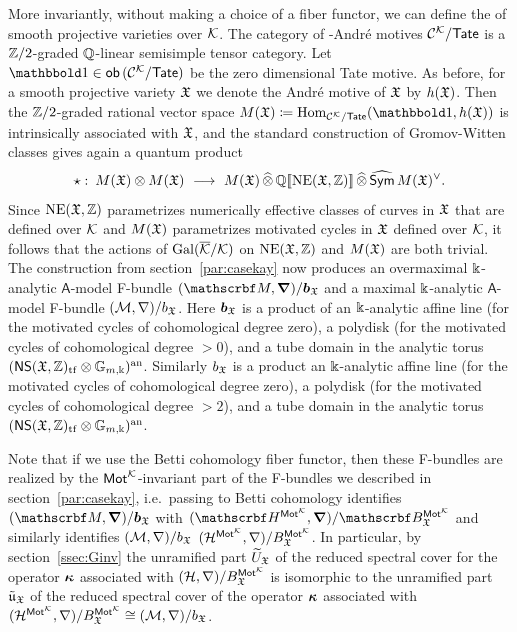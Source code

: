 \documentclass[twoside,leqno]{article}
\numberwithin{equation}{section}
\theoremstyle{plain}
\theoremstyle{definition}
\begin{document}
More invariantly, without making a choice of a fiber functor, we can define the  of smooth projective varieties over $\mathcal K$. The category of \nc-Andr\'e motives $\mathcal{C}^{\mathcal K}/\mathsf{Tate}$ is a $\mathbb Z/2$-graded $\mathbb Q$-linear semisimple tensor category. Let $\triv \in \mathsf{ob} \, (\CA{\kay}/\mathsf{Tate})$
be the zero dimensional Tate motive. As before, for a smooth projective variety $\mathfrak X$ we denote the Andr\'{e} motive of $\mathfrak X$ by $h(\mathfrak X)$. Then the $\mathbb Z/2$-graded rational vector space $M(\fX) \coloneqq \op{Hom}_{\CA{\kay}/\mathsf{Tate}}(\triv,h(\fX))$ is intrinsically associated with $\mathfrak X$, and the standard construction of Gromov-Witten classes gives again a quantum product 
\[
\star \, \colon \, M(\mathfrak X)\otimes M(\mathfrak X) \ \longrightarrow \ M(\mathfrak X)\, \widehat{\otimes} \, \mathbb Q[\![\operatorname{NE}(\mathfrak X,\mathbb Z)]\!] \, \widehat{\otimes}\, \widehat{\mathsf{Sym}}\, M(\mathfrak X)^{\vee}. 
\]
Since $\operatorname{NE}(\mathfrak X,\mathbb Z)$ parametrizes numerically effective classes of curves in $\mathfrak X$ that are defined over $\mathcal K$ and $M(\mathfrak X)$ parametrizes motivated cycles in $\mathfrak X$ defined over $\mathcal K$, it follows that the actions of $\operatorname{Gal}(\overline{\mathcal K}/\mathcal K)$ on $\operatorname{NE}(\mathfrak X,\mathbb Z)$ and $M(\mathfrak X)$ are both trivial. The construction from section~\ref{par:casekay} now produces an overmaximal $\Bbbk$-analytic $\mathsf{A}$-model F-bundle  
$(\mycalb{M},\bnabla)/\boldsymbol{b}_{\fX}$ and a maximal $\Bbbk$-analytic $\mathsf{A}$-model F-bundle  
$(\mathcal{M},\nabla)/b_{\mathfrak X}$. Here $\boldsymbol{b}_{\mathfrak X}$ is a product of an $\Bbbk$-analytic affine line (for the motivated cycles of cohomological  degree zero), a  polydisk (for the motivated cycles of cohomological degree $>0$), and a tube domain in the analytic torus $(\mathsf{NS}(\mathfrak X,\mathbb Z)_{\operatorname{tf}}\otimes \mathbb G_{m,\Bbbk})^{\operatorname{an}}$.
Similarly $b_{\mathfrak X}$ is a product an $\Bbbk$-analytic affine line (for the motivated cycles of cohomological  degree zero), a  polydisk (for the motivated cycles of cohomological degree $>2$), and a tube domain in the analytic torus $(\mathsf{NS}(\mathfrak X,\mathbb Z)_{\operatorname{tf}}\otimes \mathbb G_{m,\Bbbk})^{\operatorname{an}}$.

Note that if we use the Betti cohomology fiber functor, then these F-bundles are realized by the $\mathsf{Mot}^{\mathcal K}$-invariant part of the F-bundles we described in section~\ref{par:casekay}, i.e.\ passing to Betti cohomology identifies  
$(\mycalb{M},\bnabla)/\boldsymbol{b}_{\fX}$ with $(\omH^{\motM^{\kay}},\bnabla)/\omB_{\fX}^{\motM^{\kay}}$ and similarly identifies  $(\mathcal{M},\nabla)/b_{\mathfrak X}$  
$(\mathcal H^{\mathsf{Mot}^{\mathcal K}},\nabla)/B_{\mathfrak X}^{\mathsf{Mot}^{\mathcal K}}$. In particular, by section~\ref{ssec:Ginv}  the unramified part $\widetilde U_{\mathfrak X}$  of the reduced spectral cover for the operator $\boldsymbol{\kappa}$ associated with  $(\mathcal H,\nabla)/B_{\mathfrak X}^{\mathsf{Mot}^{\mathcal K}}$ is isomorphic  to the unramified part $\tilde{\mathfrak{u}}_{\mathfrak X}$ of the reduced spectral cover of the operator $\boldsymbol{\kappa}$ associated with $(\mathcal H^{\mathsf{Mot}^{\mathcal K}},\nabla)/B_{\mathfrak X}^{\mathsf{Mot}^{\mathcal K}} \cong (\mathcal{M},\nabla)/b_{\mathfrak X}$. 
\end{document}
